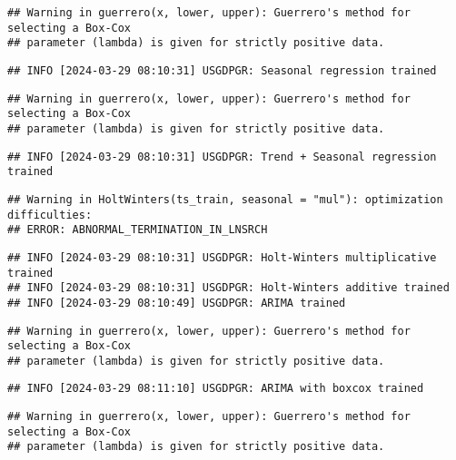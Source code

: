 \documentclass[
]{article}
\begin{document}
\begin{verbatim}
## Warning in guerrero(x, lower, upper): Guerrero's method for selecting a Box-Cox
## parameter (lambda) is given for strictly positive data.
\end{verbatim}

\begin{verbatim}
## INFO [2024-03-29 08:10:31] USGDPGR: Seasonal regression trained
\end{verbatim}

\begin{verbatim}
## Warning in guerrero(x, lower, upper): Guerrero's method for selecting a Box-Cox
## parameter (lambda) is given for strictly positive data.
\end{verbatim}

\begin{verbatim}
## INFO [2024-03-29 08:10:31] USGDPGR: Trend + Seasonal regression trained
\end{verbatim}

\begin{verbatim}
## Warning in HoltWinters(ts_train, seasonal = "mul"): optimization difficulties:
## ERROR: ABNORMAL_TERMINATION_IN_LNSRCH
\end{verbatim}

\begin{verbatim}
## INFO [2024-03-29 08:10:31] USGDPGR: Holt-Winters multiplicative trained
## INFO [2024-03-29 08:10:31] USGDPGR: Holt-Winters additive trained
## INFO [2024-03-29 08:10:49] USGDPGR: ARIMA trained
\end{verbatim}

\begin{verbatim}
## Warning in guerrero(x, lower, upper): Guerrero's method for selecting a Box-Cox
## parameter (lambda) is given for strictly positive data.
\end{verbatim}

\begin{verbatim}
## INFO [2024-03-29 08:11:10] USGDPGR: ARIMA with boxcox trained
\end{verbatim}

\begin{verbatim}
## Warning in guerrero(x, lower, upper): Guerrero's method for selecting a Box-Cox
## parameter (lambda) is given for strictly positive data.
\end{verbatim}
\end{document}
